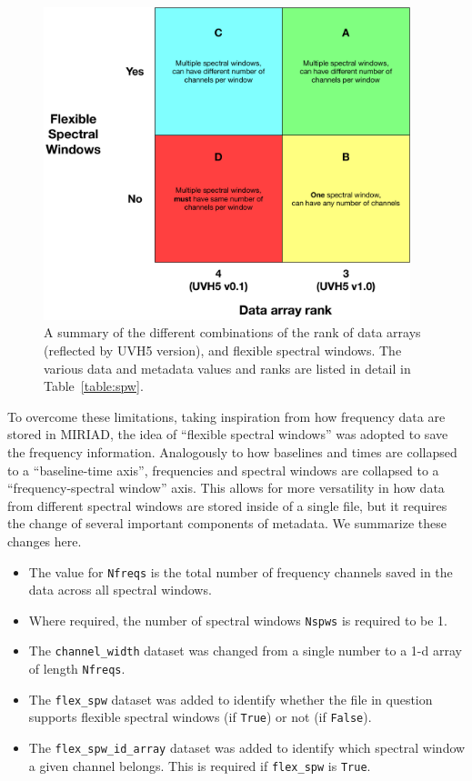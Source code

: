 \documentclass[11pt, oneside]{article}
\begin{document}
\begin{figure}[h!]
  \begin{center}
    \includegraphics[width=0.95\textwidth]{uvh5_diagram.pdf}
    \caption{A summary of the different combinations of the rank of data arrays
      (reflected by UVH5 version), and flexible spectral windows. The various
      data and metadata values and ranks are listed in detail in
      Table~\ref{table:spw}.}
    \label{fig:spws}
  \end{center}
\end{figure}

To overcome these limitations, taking inspiration from how frequency data are
stored in MIRIAD, the idea of ``flexible spectral windows'' was adopted to save
the frequency information. Analogously to how baselines and times are collapsed
to a ``baseline-time axis'', frequencies and spectral windows are collapsed to a
``frequency-spectral window'' axis. This allows for more versatility in how data
from different spectral windows are stored inside of a single file, but it
requires the change of several important components of metadata. We summarize
these changes here.
\begin{itemize}
\item The value for \verb+Nfreqs+ is the total number of frequency channels
  saved in the data across all spectral windows.
\item Where required, the number of spectral windows \verb+Nspws+ is required to
  be 1.
\item The \verb+channel_width+ dataset was changed from a single number to a 1-d
  array of length \verb+Nfreqs+.
\item The \verb+flex_spw+ dataset was added to identify whether the file in
  question supports flexible spectral windows (if \verb+True+) or not (if
  \verb+False+).
\item The \verb+flex_spw_id_array+ dataset was added to identify which spectral
  window a given channel belongs. This is required if \texttt{flex\_spw} is
  \texttt{True}.
\end{itemize}
\end{document}
